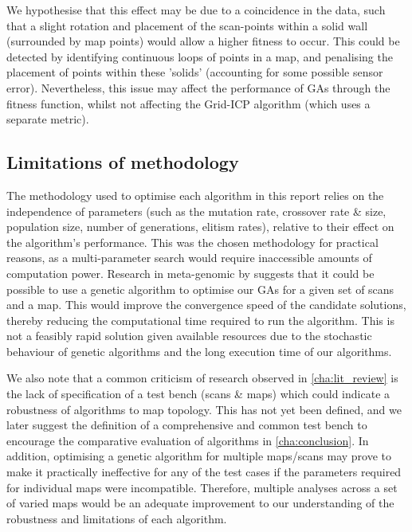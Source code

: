 \documentclass[authoryearcitations]{UoYCSproject}
\begin{document}
We hypothesise that this effect may be due to a coincidence in the data, such that a slight rotation and placement of the scan-points within a solid wall (surrounded by map points) would allow a higher fitness to occur. This could be detected by identifying continuous loops of points in a map, and penalising the placement of points within these 'solids' (accounting for some possible sensor error). Nevertheless, this issue may affect the performance of GAs through the fitness function, whilst not affecting the Grid-ICP algorithm (which uses a separate metric).

\subsection{Limitations of methodology}
\label{subsec:methodology_limitations}
The methodology used to optimise each algorithm in this report relies on the independence of parameters (such as the mutation rate, crossover rate \& size, population size, number of generations, elitism rates), relative to their effect on the algorithm's performance. This was the chosen methodology for practical reasons, as a multi-parameter search would require inaccessible amounts of computation power. Research in meta-genomic by \citet{Brain2011-pz} suggests that it could be possible to use a genetic algorithm to optimise our GAs for a given set of scans and a map. This would improve the convergence speed of the candidate solutions, thereby reducing the computational time required to run the algorithm. This is not a feasibly rapid solution given available resources due to the stochastic behaviour of genetic algorithms and the long execution time of our algorithms. \newline

We also note that a common criticism of research observed in \autoref{cha:lit_review} is the lack of specification of a test bench (scans \& maps) which could indicate a robustness of algorithms to map topology. This has not yet been defined, and we later suggest the definition of a comprehensive and common test bench to encourage the comparative evaluation of algorithms in \autoref{cha:conclusion}. In addition, optimising a genetic algorithm for multiple maps/scans may prove to make it practically ineffective for any of the test cases if the parameters required for individual maps were incompatible. Therefore, multiple analyses across a set of varied maps would be an adequate improvement to our understanding of the robustness and limitations of each algorithm.
\end{document}
